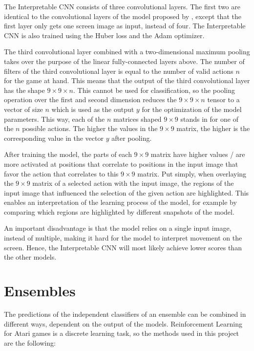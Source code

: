 The Interpretable CNN consists of three convolutional layers. The first two are identical to the convolutional layers of the model proposed by \textcite{mnih_human-level_2015}, except that the first layer only gets one screen image as input, instead of four. The Interpretable CNN is also trained using the Huber loss and the Adam optimizer.

The third convolutional layer combined with a two-dimensional maximum pooling takes over the purpose of the linear fully-connected layers above. The number of filters of the third convolutional layer is equal to the number of valid actions $n$ for the game at hand. This means that the output of the third convolutional layer has the shape $9 \times 9 \times n$. This cannot be used for classification, so the pooling operation over the first and second dimension reduces the $9 \times 9 \times n$ tensor to a vector of size $n$ which is used as the output $y$ for the optimization of the model parameters. This way, each of the $n$ matrices shaped $9 \times 9$ stands in for one of the $n$ possible actions.
The higher the values in the $9 \times 9$ matrix, the higher is the corresponding value in the vector $y$ after pooling.

After training the model, the parts of each $9 \times 9$ matrix have higher values / are more activated at positions that correlate to positions in the input image that favor the action that correlates to this $9 \times 9$ matrix. Put simply, when overlaying the $9 \times 9$ matrix of a selected action with the input image, the regions of the input image that influenced the selection of the given action are highlighted. This enables an interpretation of the learning process of the model, for example by comparing which regions are highlighted by different snapshots of the model.

An important disadvantage is that the model relies on a single input image, instead of multiple, making it hard for the model to interpret movement on the screen. Hence, the Interpretable CNN will most likely achieve lower scores than the other models.

\section{Ensembles}

The predictions of the independent classifiers of an ensemble can be combined in different ways, dependent on the output of the models. Reinforcement Learning for Atari games is a discrete learning task, so the methods used in this project are the following:

